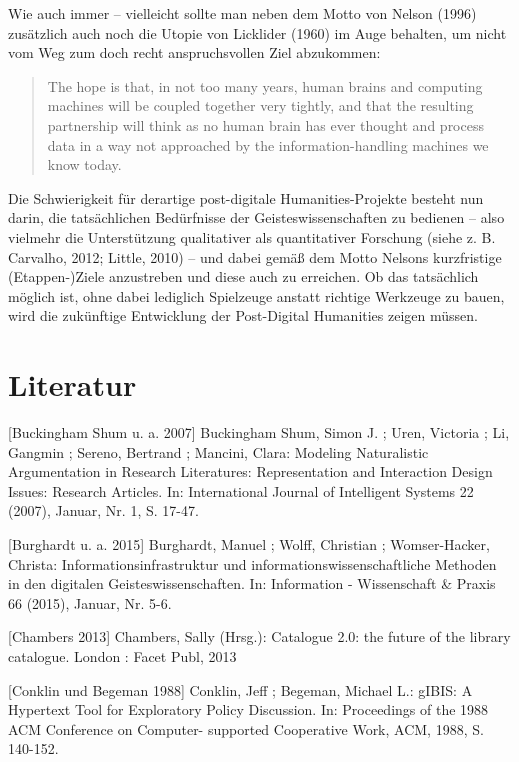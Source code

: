 \documentclass[a4paper,
fontsize=11pt,
oneside,
numbers=noperiodatend,
parskip=half-,
bibliography=totoc,
final
]{scrartcl}
\begin{document}
Wie auch immer -- vielleicht sollte man neben dem Motto von Nelson
(1996) zusätzlich auch noch die Utopie von Licklider (1960) im Auge
behalten, um nicht vom Weg zum doch recht anspruchsvollen Ziel
abzukommen:

\begin{quote}
The hope is that, in not too many years, human brains and computing
machines will be coupled together very tightly, and that the resulting
partnership will think as no human brain has ever thought and process
data in a way not approached by the information-handling machines we
know today.
\end{quote}

Die Schwierigkeit für derartige post-digitale Humanities-Projekte
besteht nun darin, die tatsächlichen Bedürfnisse der
Geisteswissenschaften zu bedienen -- also vielmehr die Unterstützung
qualitativer als quantitativer Forschung (siehe z. B. Carvalho, 2012;
Little, 2010) -- und dabei gemäß dem Motto Nelsons kurzfristige
(Etappen-)Ziele anzustreben und diese auch zu erreichen. Ob das
tatsächlich möglich ist, ohne dabei lediglich Spielzeuge anstatt
richtige Werkzeuge zu bauen, wird die zukünftige Entwicklung der
Post-Digital Humanities zeigen müssen.

\section*{Literatur}\label{literatur}

{[}Buckingham Shum u. a. 2007{]} Buckingham Shum, Simon J. ; Uren,
Victoria ; Li, Gangmin ; Sereno, Bertrand ; Mancini, Clara: Modeling
Naturalistic Argumentation in Research Literatures: Representation and
Interaction Design Issues: Research Articles. In: International Journal
of Intelligent Systems 22 (2007), Januar, Nr. 1, S. 17-47.

{[}Burghardt u. a. 2015{]} Burghardt, Manuel ; Wolff, Christian ;
Womser-Hacker, Christa: Informationsinfrastruktur und
informationswissenschaftliche Methoden in den digitalen
Geisteswissenschaften. In: Information - Wissenschaft \& Praxis 66
(2015), Januar, Nr. 5-6.

{[}Chambers 2013{]} Chambers, Sally (Hrsg.): Catalogue 2.0: the future
of the library catalogue. London : Facet Publ, 2013

{[}Conklin und Begeman 1988{]} Conklin, Jeff ; Begeman, Michael L.:
gIBIS: A Hypertext Tool for Exploratory Policy Discussion. In:
Proceedings of the 1988 ACM Conference on Computer- supported
Cooperative Work, ACM, 1988, S. 140-152.
\end{document}
